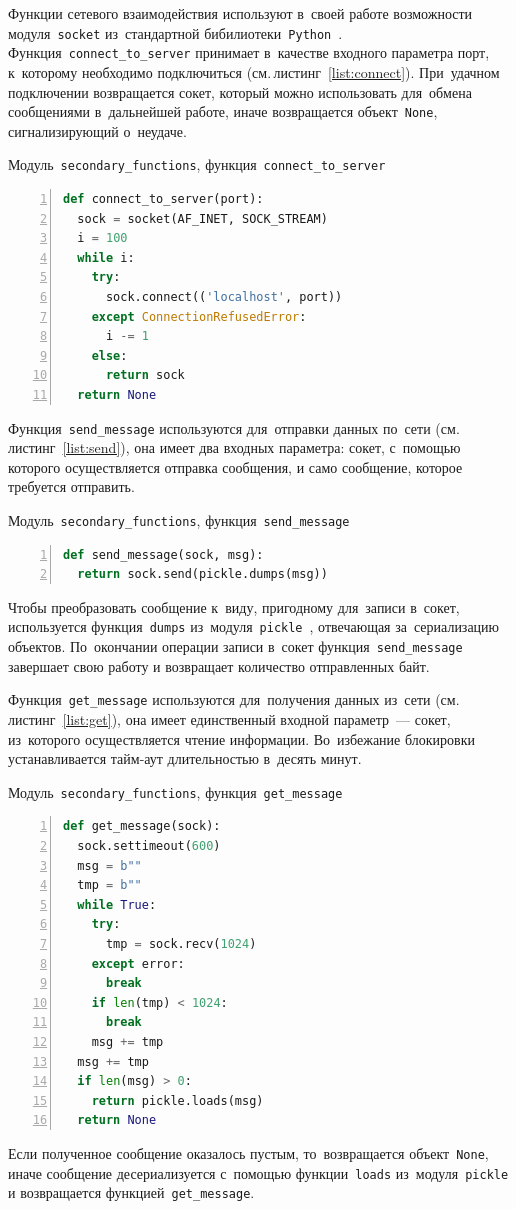 Функции сетевого взаимодействия используют в~своей работе возможности модуля~\texttt{socket} из~стандартной бибилиотеки~\texttt{Python}~\autocite{socket}. Функция~\texttt{connect_to_server} принимает в~качестве входного параметра порт, к~которому необходимо подключиться (см.\,листинг~\ref{list:connect}). При~удачном подключении возвращается сокет, который можно использовать для~обмена сообщениями в~дальнейшей работе, иначе возвращается объект~\texttt{None}, сигнализирующий о~неудаче.
\begin{ListingEnv}\caption{Модуль~\texttt{secondary\_functions}, функция~\texttt{connect\_to\_server}}\label{list:connect}
\begin{lstlisting}[language=Python, numbers=left]
def connect_to_server(port):
  sock = socket(AF_INET, SOCK_STREAM)
  i = 100
  while i:
    try:
      sock.connect(('localhost', port))
    except ConnectionRefusedError:
      i -= 1
    else:
      return sock
  return None
\end{lstlisting}
\end{ListingEnv}

Функция~\texttt{send_message} используются для~отправки данных по~сети (см.\,листинг~\ref{list:send}), она имеет два входных параметра: сокет, с~помощью которого осуществляется отправка сообщения, и само сообщение, которое требуется отправить.
\begin{ListingEnv}\caption{Модуль~\texttt{secondary\_functions}, функция~\texttt{send\_message}}\label{list:send}
\begin{lstlisting}[language=Python, numbers=left]
def send_message(sock, msg):
  return sock.send(pickle.dumps(msg))
\end{lstlisting}
\end{ListingEnv}
Чтобы преобразовать сообщение к~виду, пригодному для~записи в~сокет, используется функция~\texttt{dumps} из~модуля~\texttt{pickle}~\autocite{pickle}, отвечающая за~сериализацию объектов. По~окончании операции записи в~сокет функция~\texttt{send_message} завершает свою работу и возвращает количество отправленных байт.

Функция~\texttt{get_message} используются для~получения данных из~сети (см.\,листинг~\ref{list:get}), она имеет единственный входной параметр~--- сокет, из~которого осуществляется чтение информации. Во~избежание блокировки устанавливается тайм-аут длительностью в~десять минут.
\begin{ListingEnv}\caption{Модуль~\texttt{secondary\_functions}, функция~\texttt{get\_message}}\label{list:get}
	\begin{lstlisting}[language=Python, numbers=left]
def get_message(sock):
  sock.settimeout(600)
  msg = b""
  tmp = b""
  while True:
    try:
      tmp = sock.recv(1024)
    except error:
      break
    if len(tmp) < 1024:
      break
    msg += tmp
  msg += tmp
  if len(msg) > 0:
    return pickle.loads(msg)
  return None
\end{lstlisting}
\end{ListingEnv}
Если полученное сообщение оказалось пустым, то~возвращается объект~\texttt{None}, иначе сообщение десериализуется с~помощью функции~\texttt{loads} из~модуля~\texttt{pickle} и возвращается функцией~\texttt{get_message}.

